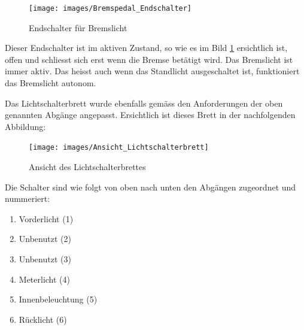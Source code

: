 \begin{itemize}
\begin{figure}[h!]
	\centering
		\texttt{[image: images/Bremspedal\_Endschalter]}
	\caption{Endschalter für Bremslicht}
	\label{fig:EndschalterBremslicht}
\end{figure}

Dieser Endschalter ist im aktiven Zustand, so wie es im Bild \ref{fig:EndschalterBremslicht} ersichtlich ist, offen und schliesst sich erst wenn die Bremse betätigt wird. Das Bremslicht ist immer aktiv. Das heisst auch wenn das Standlicht ausgeschaltet ist, funktioniert das Bremslicht autonom.

\end{itemize}

\newpage

Das Lichtschalterbrett wurde ebenfalls gemäss den Anforderungen der oben genannten Abgänge angepasst. Ersichtlich ist dieses Brett in der nachfolgenden Abbildung:

\begin{figure}[h!]
	\centering
		\texttt{[image: images/Ansicht\_Lichtschalterbrett]}
	\caption{Ansicht des Lichtschalterbrettes}
	\label{fig:AnsichtLichtschalterbrett}
\end{figure}

Die Schalter sind wie folgt von oben nach unten den Abgängen zugeordnet und nummeriert:

\begin{enumerate}
\item Vorderlicht (1)
\item Unbenutzt (2)
\item Unbenutzt (3)
\item Meterlicht (4)
\item Innenbeleuchtung (5)
\item Rücklicht (6)
\end{enumerate}

\color{black}
\newpage